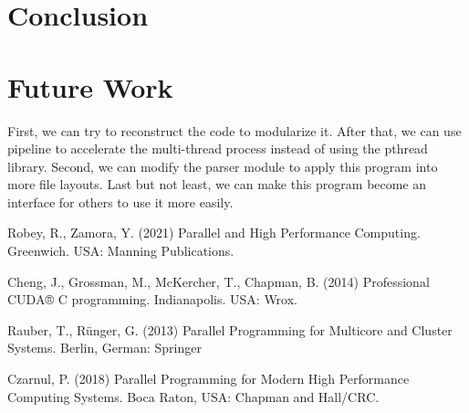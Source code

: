 \documentclass[10pt,twocolumn,letterpaper]{article}
\begin{document}
\section*{Conclusion}

\section*{Future Work}

First, we can try to reconstruct the code to modularize it. After that, we can use pipeline to accelerate the multi-thread process instead of using the pthread library.
Second, we can modify the parser module to apply this program into more file layouts.
Last but not least, we can make this program become an interface for others to use it more easily.



\begin{thebibliography}{9}
 Robey, R., Zamora, Y. (2021) Parallel and High Performance Computing. Greenwich. USA: Manning Publications.

 Cheng, J., Grossman, M., McKercher, T., Chapman, B. (2014) Professional CUDA® C programming. Indianapolis. USA: Wrox.

 Rauber, T., Rünger, G. (2013) Parallel Programming for Multicore and Cluster Systems. Berlin, German: Springer

 Czarnul, P. (2018) Parallel Programming for Modern High Performance Computing Systems. Boca Raton, USA: Chapman and Hall/CRC.

\end{thebibliography}
\end{document}
